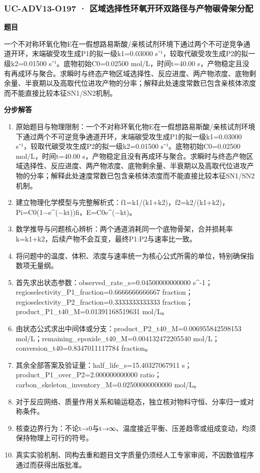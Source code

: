 \documentclass[UTF8,11pt,a4paper]{ctexart}
\begin{document}
\subsubsection*{UC-ADV13-O197 · 区域选择性环氧开环双路径与产物碳骨架分配}
\noindent\textbf{题目}\par
一个不对称环氧化物E在一假想路易斯酸/亲核试剂环境下通过两个不可逆竞争通道开环，末端碳受攻生成P1的拟一级k1=0.03000 s⁻¹，较取代碳受攻生成P2的拟一级k2=0.01500 s⁻¹。底物初始C0=0.02500 mol/L，时间t=40.00 s，产物稳定且没有再成环与聚合。求瞬时与终态产物区域选择性、反应进度、两产物浓度、底物剩余量、半衰期以及高取代位进攻产物的分率；解释此处速度常数已包含亲核体浓度而不能直接比较本征SN1/SN2机制。\par
\medskip\noindent\textbf{分步解答}
\begin{enumerate}
\item 原始题目与物理限制：一个不对称环氧化物E在一假想路易斯酸/亲核试剂环境下通过两个不可逆竞争通道开环，末端碳受攻生成P1的拟一级k1=0.03000 s⁻¹，较取代碳受攻生成P2的拟一级k2=0.01500 s⁻¹。底物初始C0=0.02500 mol/L，时间t=40.00 s，产物稳定且没有再成环与聚合。求瞬时与终态产物区域选择性、反应进度、两产物浓度、底物剩余量、半衰期以及高取代位进攻产物的分率；解释此处速度常数已包含亲核体浓度而不能直接比较本征SN1/SN2机制。
\item 建立物理化学模型与完整解析式：f1=k1/(k1+k2)，f2=k2/(k1+k2)，Pi=C0(1−e\textasciicircum{}(−kt))fi，E=C0e\textasciicircum{}(−kt)。
\item 数学推导与问题核心辨析：两个通道消耗同一个底物骨架，合并损耗率k=k1+k2，后续产物不会互变，最终P1:P2与速率比一致。
\item 将问题中的温度、体积、浓度与速率统一为核心公式所需的单位，特别确保指数项无量纲。
\item 首先求出状态参数：observed\_rate\_s=0.04500000000000 s\textasciicircum{}-1；regioselectivity\_P1\_fraction=0.6666666666667 fraction；regioselectivity\_P2\_fraction=0.3333333333333 fraction；product\_P1\_t40\_M=0.01391168519631 mol/L。
\item 由状态公式求出中间体或分支：product\_P2\_t40\_M=0.006955842598153 mol/L；remaining\_epoxide\_t40\_M=0.004132472205540 mol/L；conversion\_t40=0.8347011117784 fraction。
\item 其余全部答案及验证量：half\_life\_s=15.40327067911 s；product\_P1\_over\_P2=2.000000000000 ratio；carbon\_skeleton\_inventory\_M=0.02500000000000 mol/L。
\item 对于反应网络、质量作用关系和输运稳态，独立核对物料守恒、分率归一或对称条件。
\item 核查边界行为：不论t→0与t→∞、温度接近平衡、压差趋零或组成变动，均须保持物理上可行的符号。
\item 真实实验机制、同构去重和题目文字质量仍须经人工专家审阅，不因数值程序通过而获得出版批准。
\end{enumerate}
\end{document}
